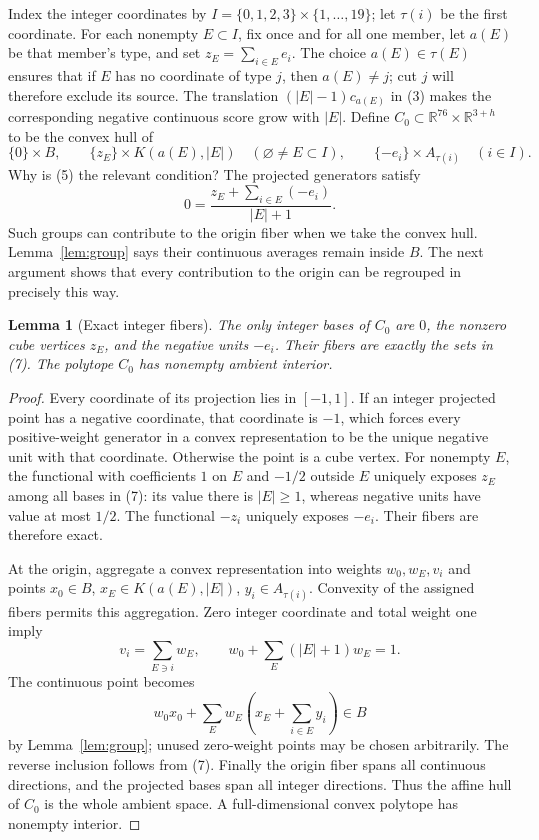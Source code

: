 \documentclass[10pt,letterpaper]{article}
\newtheorem{lemma}{Lemma}
\newcommand{\R}{\mathbb R}\newcommand{\Z}{\mathbb Z}
\newcommand{\head}[1]{\vspace{5pt}{\large\bfseries\color{ink}#1}\par}
\begin{document}
\newpage
\head{The convex body and its actual fibers}
Index the integer coordinates by
$I=\{0,1,2,3\}\times\{1,\ldots,19\}$; let $\tau(i)$ be the first coordinate.
For each nonempty $E\subset I$, fix once and for all one member,
let $a(E)$ be that member's type, and set $z_E=\sum_{i\in E}e_i$.
The choice $a(E)\in\tau(E)$ ensures that if $E$ has no coordinate of type
$j$, then $a(E)\ne j$; cut $j$ will therefore exclude its source. The translation $(|E|-1)c_{a(E)}$ in (3) makes
the corresponding negative continuous score grow with $|E|$.
Define $C_0\subset\R^{76}\times\R^{3+h}$ to be the convex hull of
\[
 \{0\}\times B,\qquad
 \{z_E\}\times K(a(E),|E|)\quad(\varnothing\ne E\subset I),\qquad
 \{-e_i\}\times A_{\tau(i)}\quad(i\in I).\tag{7}
\]
Why is (5) the relevant condition? The projected generators satisfy
\[
                  0=\frac{z_E+\sum_{i\in E}(-e_i)}{|E|+1}.
\]
Such groups can contribute to the origin fiber when we take the convex hull.
Lemma~\ref{lem:group} says their continuous averages remain inside $B$.
The next argument shows that every contribution to the origin can be
regrouped in precisely this way.

\begin{lemma}[Exact integer fibers]\label{lem:fibers}
The only integer bases of $C_0$ are $0$, the nonzero cube vertices $z_E$,
and the negative units $-e_i$. Their fibers are exactly the sets in (7).
The polytope $C_0$ has nonempty ambient interior.
\end{lemma}
\begin{proof}
Every coordinate of its projection lies in $[-1,1]$. If an integer projected
point has a negative coordinate, that coordinate is $-1$, which forces every
positive-weight generator in a convex representation to be the unique
negative unit with that coordinate. Otherwise the point is a cube vertex.
For nonempty $E$, the functional with coefficients $1$ on $E$ and $-1/2$
outside $E$ uniquely exposes $z_E$ among all bases in (7): its value there
is $|E|\ge1$, whereas negative units have value at most $1/2$.
The functional $-z_i$ uniquely exposes $-e_i$. Their fibers are therefore exact.

At the origin, aggregate a convex representation into weights $w_0,w_E,v_i$
and points $x_0\in B$, $x_E\in K(a(E),|E|)$, $y_i\in A_{\tau(i)}$.
Convexity of the assigned fibers permits this aggregation. Zero integer
coordinate and total weight one imply
\[
 v_i=\sum_{E\ni i}w_E,\qquad w_0+\sum_E(|E|+1)w_E=1.
\]
The continuous point becomes
\[
 w_0x_0+\sum_Ew_E\left(x_E+\sum_{i\in E}y_i\right)\in B
\]
by Lemma~\ref{lem:group}; unused zero-weight points may be chosen arbitrarily.
The reverse inclusion follows from (7). Finally the origin fiber spans all
continuous directions, and the projected bases span all integer directions.
Thus the affine hull of $C_0$ is the whole ambient space. A full-dimensional
convex polytope has nonempty interior.
\end{proof}
\end{document}
